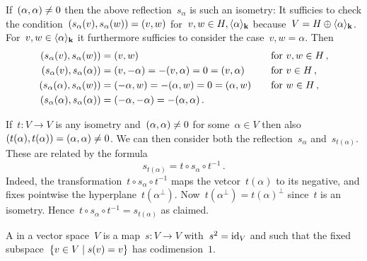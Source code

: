 \begin{recall}
\begin{enumerate}
      If~$(\alpha, \alpha) \neq 0$ then the above reflection~$s_\alpha$ is such an isometry:
      It sufficies to check the condition~$(s_\alpha(v), s_\alpha(w)) = (v,w)$ for~$v, w \in H, \langle\alpha\rangle_{\mathbf{k}}$ because~$V = H \oplus \langle\alpha\rangle_{\mathbf{k}}$.
      For~$v, w \in \langle\alpha\rangle_{\mathbf{k}}$ it furthermore sufficies to consider the case~$v, w = \alpha$.
      Then
      \begin{alignat*}{2}
        (s_\alpha(v), s_\alpha(w))
        &=
        (v, w)
        &
        \quad
        &\text{for~$v, w \in H$} \,,
        \\
        (s_\alpha(v), s_\alpha(\alpha))
        &=
        (v, -\alpha)
        =
        -(v,\alpha)
        =
        0
        =
        (v, \alpha)
        &
        \quad
        &\text{for~$v \in H$} \,,
        \\
        (s_\alpha(\alpha), s_\alpha(w))
        &=
        (-\alpha, w)
        =
        -(\alpha, w)
        =
        0
        =
        (\alpha, w)
        &
        \quad
        &\text{for~$w \in H$} \,,
        \\
        (s_\alpha(\alpha), s_\alpha(\alpha))
        &=
        (-\alpha, -\alpha)
        =
        -(\alpha,\alpha) \,.
        &
        {}
        &
        {}
      \end{alignat*}
      
      If~$t \colon V \to V$ is any isometry and~$(\alpha, \alpha) \neq 0$ for some~$\alpha \in V$ then also~$(t(\alpha), t(\alpha)) = (\alpha, \alpha) \neq 0$.
      We can then consider both the reflection~$s_\alpha$ and~$s_{t(\alpha)}$.
      These are related by the formula
      \[
        s_{t(\alpha)}
        =
        t \circ s_{\alpha} \circ t^{-1} \,.
      \]
      Indeed, the transformation~$t \circ s_{\alpha} \circ t^{-1}$ maps the vetcor~$t(\alpha)$ to its negative, and fixes pointwise the hyperplane~$t(\alpha^\perp)$.
      Now~$t(\alpha^\perp) = t(\alpha)^\perp$ since~$t$ is an isometry.
      Hence~$t \circ s_{\alpha} \circ t^{-1}  = s_{t(\alpha)}$ as claimed.
  \end{enumerate}
\end{recall} 


\begin{definition}
  A  in a vector space~$V$ is a map~$s \colon V \to V$ with~$s^2 = \operatorname{id}_V$ and such that the fixed subspace~$\{v \in V \suchthat s(v) = v\}$ has codimension~$1$.
\end{definition}


